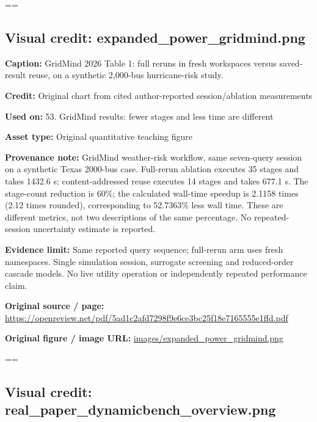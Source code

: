 \documentclass[10pt,letterpaper]{article}
\begin{document}
\egroup\par\noindent\box\readingEntry\par\medskip
\setbox\readingEntry=\vbox\bgroup\hsize=\linewidth\subsection*{Visual credit: expanded\_power\_gridmind.png}
\textbf{Caption:} GridMind 2026 Table 1: full reruns in fresh workspaces versus saved-result reuse, on a synthetic 2,000-bus hurricane-risk study.\par
\textbf{Credit:} Original chart from cited author-reported session/ablation measurements\par
\textbf{Used on:} 53. GridMind results: fewer stages and less time are different\par
\textbf{Asset type:} Original quantitative teaching figure\par
\textbf{Provenance note:} GridMind weather-risk workflow, same seven-query session on a synthetic Texas 2000-bus case. Full-rerun ablation executes 35 stages and takes 1432.6 s; content-addressed reuse executes 14 stages and takes 677.1 s. The stage-count reduction is 60\%; the calculated wall-time speedup is 2.1158 times  (2.12 times  rounded), corresponding to 52.7363\% less wall time. These are different metrics, not two descriptions of the same percentage. No repeated-session uncertainty estimate is reported.\par
\textbf{Evidence limit:} Same reported query sequence; full-rerun arm uses fresh namespaces. Single simulation session, surrogate screening and reduced-order cascade models. No live utility operation or independently repeated performance claim.\par
\textbf{Original source / page:} \href{https://openreview.net/pdf/5ad1c2afd7298f9e6ce3bc25f18e7165555e1ffd.pdf}{\small\ttfamily https:/\allowbreak{}/\allowbreak{}openreview.\allowbreak{}net/\allowbreak{}pdf/\allowbreak{}5ad1c2afd7298f9e6ce3bc25f18e7165555e1ffd.\allowbreak{}pdf}\par
\textbf{Original figure / image URL:} \href{images/expanded_power_gridmind.png}{\small\ttfamily images/\allowbreak{}expanded\_\allowbreak{}power\_\allowbreak{}gridmind.\allowbreak{}png}\par
\egroup\par\noindent\box\readingEntry\par\medskip
\setbox\readingEntry=\vbox\bgroup\hsize=\linewidth\subsection*{Visual credit: real\_paper\_dynamicbench\_overview.png}
\end{document}
